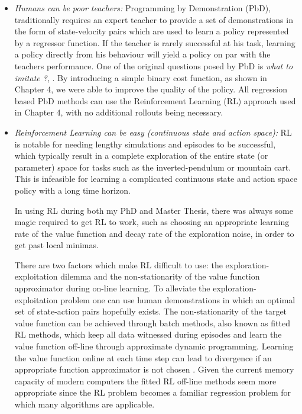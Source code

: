 \begin{itemize}

 \item \textit{Humans can be poor teachers:}  Programming by Demonstration (PbD), traditionally requires an expert 
 teacher to provide a set of demonstrations in the form of state-velocity pairs which are used to learn 
 a policy represented by a regressor function. If the teacher is rarely successful at his task, learning a policy
 directly from his behaviour will yield a policy on par with the teachers performance.
 One of the original questions posed by PbD is \textit{what to imitate ?}, \cite{Billard08chapter}.
 By introducing a simple binary cost function, as shown in Chapter 4, we were able to improve the quality of the policy.
 All regression based PbD methods can use the Reinforcement Learning (RL) approach used in Chapter 4, with no additional 
 rollouts being necessary.
 
 \item \textit{Reinforcement Learning can be easy (continuous state and action space):} 
 RL is notable for needing lengthy simulations and episodes to be successful, which typically result in 
 a complete exploration of the entire state (or parameter) space for tasks
 such as the inverted-pendulum or mountain cart.  This is infeasible for learning a  complicated continuous state 
 and action space policy with a long time horizon.
 
 In using RL during both my PhD and Master Thesis, there was always some magic required
 to get RL to work, such as choosing an appropriate learning rate of the value function 
 and decay rate of the exploration noise, in order to get past local minimas. 
 
 There are two factors which make RL difficult to use: the exploration-exploitation 
 dilemma and the non-stationarity of the value function approximator during on-line learning.
 To alleviate the exploration-exploitation problem one can use human demonstrations 
 in which an optimal set of state-action pairs hopefully exists. The non-stationarity
 of the target value function can be achieved through batch methods, also known as fitted RL methods, which 
 keep all data witnessed during episodes and learn the value function off-line through 
 approximate dynamic programming. 
 Learning the value function online at each time step can lead to divergence if an appropriate 
 function approximator is not chosen \cite[p. 51]{RL_book_2010}. Given the current memory capacity 
 of modern computers the fitted RL off-line methods seem more appropriate since the RL problem
 becomes a familiar regression problem for which many algorithms are applicable.
 

\end{itemize}
